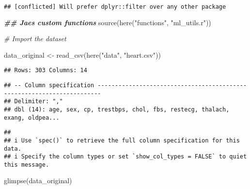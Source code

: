 \documentclass[
]{book}
\newenvironment{Shaded}{\begin{snugshade}}{\end{snugshade}}
\newcommand{\CommentTok}[1]{\textcolor[rgb]{0.56,0.35,0.01}{\textit{#1}}}
\newcommand{\DocumentationTok}[1]{\textcolor[rgb]{0.56,0.35,0.01}{\textbf{\textit{#1}}}}
\newcommand{\FunctionTok}[1]{\textcolor[rgb]{0.00,0.00,0.00}{#1}}
\newcommand{\NormalTok}[1]{#1}
\newcommand{\OtherTok}[1]{\textcolor[rgb]{0.56,0.35,0.01}{#1}}
\newcommand{\StringTok}[1]{\textcolor[rgb]{0.31,0.60,0.02}{#1}}
\begin{document}
\begin{verbatim}
## [conflicted] Will prefer dplyr::filter over any other package
\end{verbatim}

\begin{Shaded}
\begin{Highlighting}[]
\DocumentationTok{\#\# Jae\textquotesingle{}s custom functions}
\FunctionTok{source}\NormalTok{(}\FunctionTok{here}\NormalTok{(}\StringTok{"functions"}\NormalTok{, }\StringTok{"ml\_utils.r"}\NormalTok{))}

\CommentTok{\# Import the dataset}

\NormalTok{data\_original }\OtherTok{\textless{}{-}} \FunctionTok{read\_csv}\NormalTok{(}\FunctionTok{here}\NormalTok{(}\StringTok{"data"}\NormalTok{, }\StringTok{"heart.csv"}\NormalTok{))}
\end{Highlighting}
\end{Shaded}

\begin{verbatim}
## Rows: 303 Columns: 14
\end{verbatim}

\begin{verbatim}
## -- Column specification -----------------------------------------------------------------------
## Delimiter: ","
## dbl (14): age, sex, cp, trestbps, chol, fbs, restecg, thalach, exang, oldpea...
\end{verbatim}

\begin{verbatim}
## 
## i Use `spec()` to retrieve the full column specification for this data.
## i Specify the column types or set `show_col_types = FALSE` to quiet this message.
\end{verbatim}

\begin{Shaded}
\begin{Highlighting}[]
\FunctionTok{glimpse}\NormalTok{(data\_original)}
\end{Highlighting}
\end{Shaded}
\end{document}
